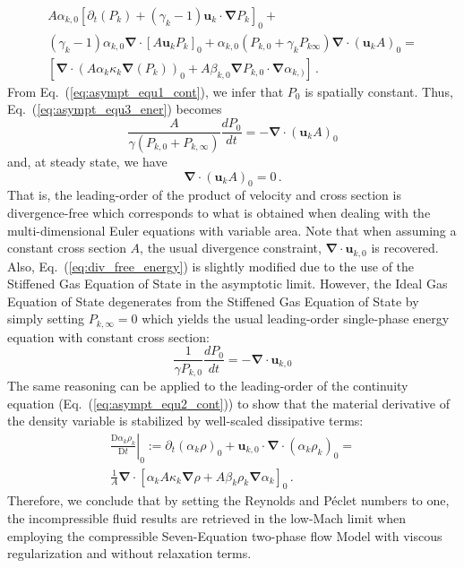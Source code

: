 \documentclass[preprint,10pt]{elsarticle}
\renewcommand{\div}{\mbold{\nabla}\! \cdot \!}
\newcommand{\grad}{\mbold{\nabla}}
\newcommand{\mbold}[1]{\boldsymbol#1}
\newcommand{\matder}[1]{\frac{\textrm{D} #1}{\textrm{D} t}}
\newcommand{\eqt}[1]{Eq.~(\ref{#1})}                     %
\begin{document}
%
\begin{multline}\label{eq:asympt_equ3_ener}
A \alpha_{k,0} \left[ \partial_t \left( P_k \right) + (\gamma_k-1)\mbold u_k \cdot \grad  P_k \right]_0 + \\ (\gamma_k-1) \alpha_{k,0} \div \left[ A \mbold u_k P_k \right]_0 +
\alpha_{k,0} \left( P_{k,0} + \gamma_k P_{k\infty} \right) \div \left( \mbold u_k A\right)_0 = \\
\left[ \div(A \alpha_k \kappa_k \grad(P_k))_0 + A \beta_{k,0} \grad P_{k,0} \cdot \grad \alpha_{k,)} \right]  \,.
\end{multline}
%
From \eqt{eq:asympt_equ1_cont}, we infer that $P_0$ is spatially constant. Thus, \eqt{eq:asympt_equ3_ener} becomes
%
\begin{equation}\label{eq:div_free_energy}
\frac{A}{\gamma\left( P_{k,0} + P_{k,\infty} \right)} \frac{d P_0}{dt} = - \div \left( \mbold u_k A \right)_0 
\end{equation}
%
and, at steady state, we have
%
\begin{equation}
\div \left( \mbold u_k A \right)_0  = 0 \, .
\end{equation}
%
That is, the leading-order of the product of velocity and cross section is divergence-free which corresponds to what is obtained when dealing with the multi-dimensional Euler equations with variable area. Note that when assuming a constant cross section $A$, the usual divergence constraint, $\div \mbold u_{k,0}$ is recovered. Also, \eqt{eq:div_free_energy} is slightly modified due to the use of the Stiffened Gas Equation of State in the asymptotic limit. However, the Ideal Gas Equation of State degenerates from the Stiffened Gas Equation of State by simply setting $P_{k,\infty}=0$ which yields the usual leading-order single-phase energy equation with constant cross section:
%
\begin{equation}
\frac{1}{\gamma P_{k,0}} \frac{d P_0}{dt} = - \div\mbold u_{k,0} 
\end{equation}
%
The same reasoning can be applied to the leading-order 
of the continuity equation (\eqt{eq:asympt_equ2_cont}) to show that the material derivative of the density variable is stabilized by well-scaled dissipative terms:
\begin{multline}
\left. \matder{\alpha_k \rho_k}\right|_0 := \partial_t \left( \alpha_k \rho\right)_0 + \mbold u_{k,0} \cdot \div \left( \alpha_k \rho_k \right)_0 =\\
\frac{1}{A}  \div \left[ \alpha_k A \kappa_k \grad \rho + A \beta_k \rho_k \grad \alpha_k \right]_0 \, .
\end{multline}
%
Therefore, we conclude that by setting the Reynolds and P\'eclet numbers to one, the incompressible fluid 
results are retrieved in the low-Mach limit when employing the compressible Seven-Equation two-phase flow Model with viscous regularization and without relaxation terms.
\end{document}
